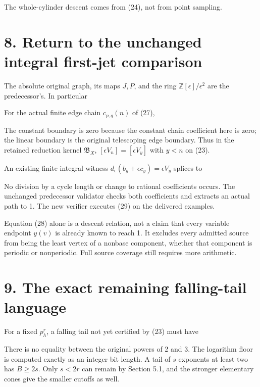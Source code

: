 The whole-cylinder descent comes from (24), not from point sampling.

\section{8. Return to the unchanged integral first-jet comparison}

The absolute original graph, its maps \(J,P\), and the ring
\(\mathbb Z[\epsilon]/\epsilon^2\) are the predecessor's. In particular


For the actual finite edge chain \(c_{p,q}(n)\) of (27),


The constant boundary is zero because the constant chain coefficient
here is zero; the linear boundary is the original telescoping edge
boundary. Thus in the retained reduction kernel \(\mathfrak B_X\),
\([\epsilon V_n]=[\epsilon V_y]\) with \(y<n\) on (23).

An existing finite integral witness
\(d_\epsilon(b_y+\epsilon c_y)=\epsilon V_y\) splices to


No division by a cycle length or change to rational coefficients occurs.
The unchanged predecessor validator checks both coefficients and
extracts an actual path to 1. The new verifier executes (29) on the
delivered examples.

Equation (28) alone is a descent relation, not a claim that every
variable endpoint \(y(v)\) is already known to reach 1. It excludes
every admitted source from being the least vertex of a nonbase
component, whether that component is periodic or nonperiodic. Full
source coverage still requires more arithmetic.

\section{9. The exact remaining falling-tail language}

For a fixed \(p_h^r\), a falling tail not yet certified by (23) must
have


There is no equality between the original powers of 2 and 3. The
logarithm floor is computed exactly as an integer bit length. A tail of
\(s\) exponents at least two has \(B\ge2s\). Only \(s<2r\) can remain by
Section 5.1, and the stronger elementary cones give the smaller cutoffs
as well.

